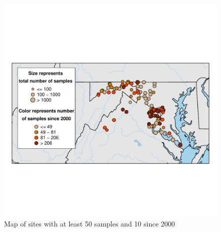 \documentclass[a4paper,11pt]{article}\usepackage[]{graphicx}\usepackage[]{color}
\makeatletter
\def\maxwidth{ %
  \ifdim\Gin@nat@width>\linewidth
    \linewidth
  \else
    \Gin@nat@width
  \fi
}
\newenvironment{knitrout}{}{} %
\makeatother
\begin{document}
\begin{knitrout}
\color{fgcolor}\begin{figure}
\includegraphics[width=\maxwidth]{figure/filteredMap-1} \caption[Map of sites with at least 50 samples and 10 since 2000]{Map of sites with at least 50 samples and 10 since 2000}\label{fig:filteredMap}
\end{figure}


\end{knitrout}

\end{document}

